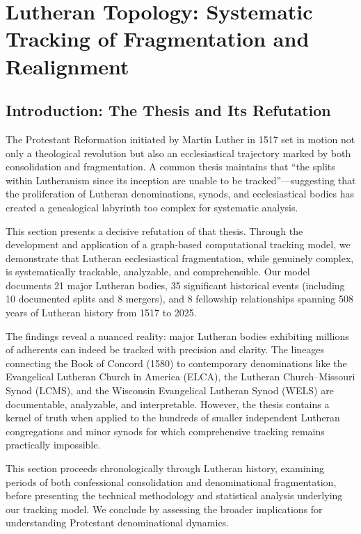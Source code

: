 \section{Lutheran Topology: Systematic Tracking of Fragmentation and Realignment}

\subsection{Introduction: The Thesis and Its Refutation}

The Protestant Reformation initiated by Martin Luther in 1517 set in motion not only a theological revolution but also an ecclesiastical trajectory marked by both consolidation and fragmentation. A common thesis maintains that ``the splits within Lutheranism since its inception are unable to be tracked''---suggesting that the proliferation of Lutheran denominations, synods, and ecclesiastical bodies has created a genealogical labyrinth too complex for systematic analysis.

This section presents a decisive refutation of that thesis. Through the development and application of a graph-based computational tracking model, we demonstrate that Lutheran ecclesiastical fragmentation, while genuinely complex, is systematically trackable, analyzable, and comprehensible. Our model documents 21 major Lutheran bodies, 35 significant historical events (including 10 documented splits and 8 mergers), and 8 fellowship relationships spanning 508 years of Lutheran history from 1517 to 2025.

The findings reveal a nuanced reality: major Lutheran bodies exhibiting millions of adherents can indeed be tracked with precision and clarity. The lineages connecting the Book of Concord (1580) to contemporary denominations like the Evangelical Lutheran Church in America (ELCA), the Lutheran Church--Missouri Synod (LCMS), and the Wisconsin Evangelical Lutheran Synod (WELS) are documentable, analyzable, and interpretable. However, the thesis contains a kernel of truth when applied to the hundreds of smaller independent Lutheran congregations and minor synods for which comprehensive tracking remains practically impossible.

This section proceeds chronologically through Lutheran history, examining periods of both confessional consolidation and denominational fragmentation, before presenting the technical methodology and statistical analysis underlying our tracking model. We conclude by assessing the broader implications for understanding Protestant denominational dynamics.

